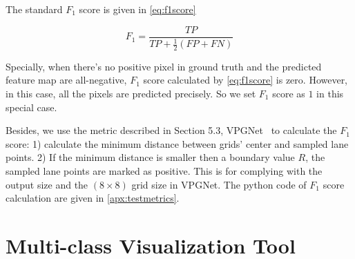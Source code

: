 \begin{spacing}{1.5}
The standard $F_1$ score is given in \autoref{eq:f1score}

\begin{equation}
\label{eq:f1score}
    F_1=\frac{TP}{TP+\frac{1}{2}(FP+FN)}
\end{equation}

Specially, when there's no positive pixel in ground truth and the predicted feature map are all-negative, $F_1$ score calculated by \autoref{eq:f1score} is zero. However, in this case, all the pixels are predicted precisely. So we set $F_1$ score as $1$ in this special case.

Besides, we use the metric described in Section 5.3, VPGNet~\cite{lee2017vpgnet} to calculate the $F_1$ score: 1) calculate the minimum distance between grids' center and sampled lane points. 2) If the minimum distance is smaller then a boundary value $R$, the sampled lane points are marked as positive. This is for complying with the output size and the $(8 \times 8)$ grid size in VPGNet. The python code of $F_1$ score calculation are given in \autoref{apx:testmetrics}.

\section{Multi-class Visualization Tool}
\label{sec:EX_multivisual}


\end{spacing}

